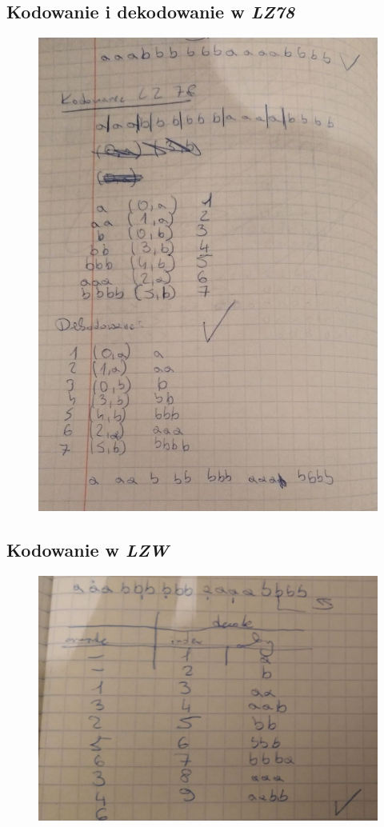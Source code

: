 \documentclass{article}
\begin{document}
\subsection{Kodowanie i dekodowanie w \textit{LZ78}}
\begin{figure}[h!]
\centering
\includegraphics[width=450px]{img/obl_lz78.jpg}
\end{figure}

\newpage

\subsection{Kodowanie w \textit{LZW}}
\begin{figure}[h!]
\centering
\includegraphics[width=450px]{img/obl_lzw.jpg}
\end{figure}
\end{document}
